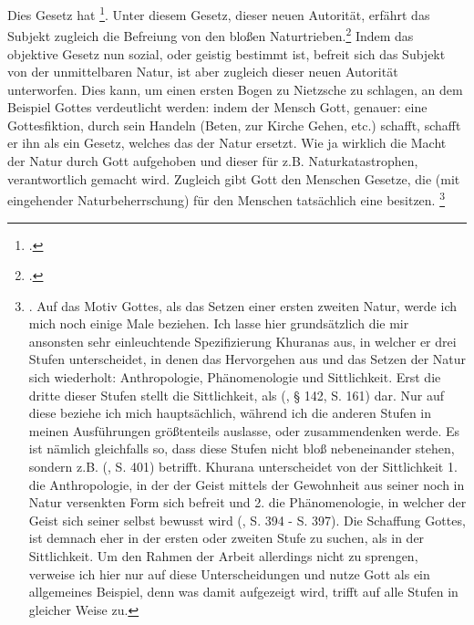 \documentclass[12pt, a4paper, openany]{report}
\begin{document}
Dies Gesetz hat \footcite[][§ 146, S. 164.]{hegel_grundlinien_2017}.
Unter diesem Gesetz, dieser neuen Autorität, erfährt das Subjekt zugleich die Befreiung von den bloßen Naturtrieben.\footcite[Vlg.][§ 149, S. 164]{hegel_grundlinien_2017} 
Indem das objektive Gesetz nun sozial, oder geistig bestimmt ist, befreit sich das Subjekt von der unmittelbaren Natur, ist aber zugleich dieser neuen Autorität unterworfen. 
Dies kann, um einen ersten Bogen zu Nietzsche zu schlagen, an dem Beispiel Gottes verdeutlicht werden: 
indem der Mensch Gott, genauer: eine Gottesfiktion, durch sein Handeln (Beten, zur Kirche Gehen, etc.) schafft, schafft er ihn als ein Gesetz, welches das der Natur ersetzt. 
Wie ja wirklich die Macht der Natur durch Gott aufgehoben und dieser für z.B. Naturkatastrophen, verantwortlich gemacht wird.
Zugleich gibt Gott den Menschen Gesetze, die (mit eingehender Naturbeherrschung) für den Menschen tatsächlich eine  besitzen.%
\footnote{
    .
    Auf das Motiv Gottes, als das Setzen einer ersten zweiten Natur, werde ich mich noch einige Male beziehen. 
    Ich lasse hier grundsätzlich die mir ansonsten sehr einleuchtende Spezifizierung Khuranas aus, in welcher er drei Stufen unterscheidet, in denen das Hervorgehen aus und das Setzen der Natur sich wiederholt: Anthropologie, Phänomenologie und Sittlichkeit.
    Erst die dritte dieser Stufen stellt die Sittlichkeit, als  (\cite{hegel_grundlinien_2017}, § 142, S. 161) dar.
    Nur auf diese beziehe ich mich hauptsächlich, während ich die anderen Stufen in meinen Ausführungen größtenteils auslasse, oder zusammendenken werde. 
    Es ist nämlich gleichfalls so, dass diese Stufen nicht bloß nebeneinander stehen, sondern z.B.  (\cite{khurana_freiheit_2017}, S. 401) betrifft.
    Khurana unterscheidet von der Sittlichkeit 1. die Anthropologie, in der der Geist mittels der Gewohnheit aus seiner noch in Natur versenkten Form sich befreit und 2. die Phänomenologie, in welcher der Geist sich seiner selbst bewusst wird (\cite{khurana_freiheit_2017}, S. 394 - S. 397).
    Die Schaffung Gottes, ist demnach eher in der ersten oder zweiten Stufe zu suchen, als in der Sittlichkeit. 
    Um den Rahmen der Arbeit allerdings nicht zu sprengen, verweise ich hier nur auf diese Unterscheidungen und nutze Gott als ein allgemeines Beispiel, denn was damit aufgezeigt wird, trifft auf alle Stufen in gleicher Weise zu. 
}
\end{document}
